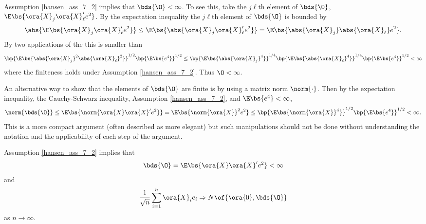 Assumption \ref{hansen_ass_7_2} implies that $\bds{\O} < \infty$. To see this, take the $j\ell$th element of $\bds{\O}$, $\E\bs{\ora{X}_j \ora{X}_\ell^\prime e^2}$.  By the expectation inequality the $j\ell$th element of $\bds{\O}$ is bounded by 
\begin{equation}
    \notag
    \abs{\E\bs{\ora{X}_j \ora{X}_\ell^\prime e^2}} \leq \E\bs{\abs{\ora{X}_j \ora{X}_\ell^\prime e^2}} = \E\bs{\abs{\ora{X}_j} \abs{\ora{X}_\ell} e^2}.
\end{equation}
By two applications of the  this is smaller than 
\begin{equation}
    \notag
    \bp{\E\bs{\abs{\ora{X}_j}^2 \abs{\ora{X}_\ell}^2}}^{1/2} \bp{\E\bs{e^4}}^{1/2} \leq \bp{\E\bs{\abs{\ora{X}_j}^4}}^{1/4} \bp{\E\bs{\abs{\ora{X}_\ell}^4}}^{1/4} \bp{\E\bs{e^4}}^{1/2} < \infty
\end{equation}
where the finiteness holds under Assumption \ref{hansen_ass_7_2}. Thus $\O < \infty$.

An alternative way to show that the elements of $\bds{\O}$ are finite is by using a matrix norm $\norm{\cdot}$. Then by the expectation inequality, the Cauchy-Schwarz inequality, Assumption \ref{hansen_ass_7_2}, and $\E\bs{e^4}<\infty$,
\begin{equation}
    \notag
    \norm{\bds{\O}} \leq \E\bs{\norm{\ora{X}\ora{X}^\prime e^2}} = \E\bs{\norm{\ora{X}}^2 e^2} \leq \bp{\E\bs{\norm{\ora{X}}^4}}^{1/2}\bp{\E\bs{e^4}}^{1/2} < \infty.
\end{equation}
This is a more compact argument (often described as more elegant) but such manipulations should not be done without understanding the notation and the applicability of each step of the argument.

\begin{theorem}
    \label{hansen_thm_7_2}
    Assumption \ref{hansen_ass_7_2} implies that 
    \begin{equation}
        \label{hansen_eq_7_6}
        \bds{\O} = \E\bs{\ora{X} \ora{X}^\prime e^2} < \infty
    \end{equation}
    and 
    \begin{equation}
        \label{hansen_eq_7_7}
        \frac{1}{\sqrt{n}} \sum_{i=1}^{n}\ora{X}_i e_i \Rightarrow N\of{\ora{0}, \bds{\O}}
    \end{equation}
    as $n \rightarrow \infty$.
\end{theorem}

